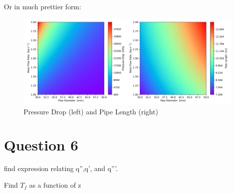 \documentclass{article}
\begin{document}
Or in much prettier form:

\begin{figure}[!hp!]
    \centering
    \includegraphics[width=\linewidth]{contour.png}
    \caption{Pressure Drop (left) and Pipe Length (right)}
    \label{fig:pipelength}
\end{figure}

\section{Question 6}
find expression relating q'',q', and q'''. 

Find $T_f$ as a function of z
\end{document}
